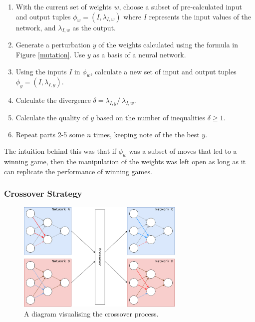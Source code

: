 \documentclass[12pt,a4paper]{article}
\begin{document}
             \begin{enumerate}
             \item With the current set of weights $w$, choose a subset of pre-calculated input and output tuples $\phi_{w} = (I, \lambda_{I,w})$ where $I$ represents the input values of the network, and $\lambda_{I,w}$ as the output.
             \item Generate a perturbation $y$ of the weights calculated using the formula in Figure \ref{mutation}. Use $y$ as a basis of a neural network. 
              \item Using the inputs $I$ in $\phi_{w}$, calculate a new set of input and output tuples $\phi_{y} = (I, \lambda_{I,y})$.
              \item Calculate the divergence $\delta = \lambda_{I,y} /\ \lambda_{I,w}.$ 
              \item Calculate the quality of $y$ based on the number of inequalities $\delta \geq 1$.
             \item Repeat parts 2-5 some $n$ times, keeping note of the the best $y$. 
             \end{enumerate}

            The intuition behind this was that if $\phi_{w}$ was a subset of moves that led to a winning game, then the manipulation of the weights was left open as long as it can replicate the performance of winning games.
            
        \subsubsection{Crossover Strategy} \label{crossover_strategy}
      
           \begin{figure}[!ht]
                \centering
                \includegraphics[width=80mm]{images/crossover.png}
                \caption{A diagram visualising the crossover process.\label{crossoverpic}}
            \end{figure}
\end{document}
